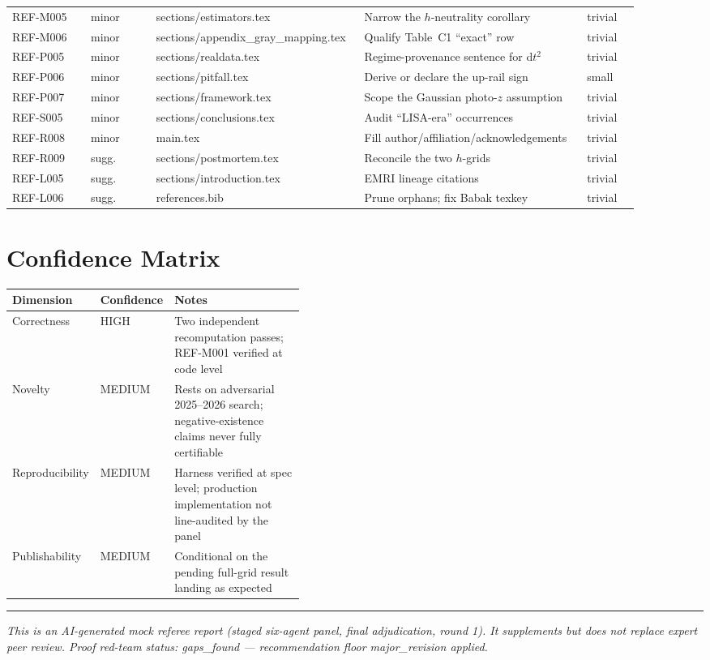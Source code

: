 \documentclass[11pt]{article}
\begin{document}
\begin{longtable}{@{}p{0.12\linewidth}p{0.10\linewidth}p{0.26\linewidth}>{\raggedright\arraybackslash}p{0.34\linewidth}p{0.08\linewidth}@{}}
REF-M005 & minor & sections/estimators.tex & Narrow the $h$-neutrality corollary & trivial \\
REF-M006 & minor & sections/appendix\_gray\_mapping.tex & Qualify Table~C1 ``exact'' row & trivial \\
REF-P005 & minor & sections/realdata.tex & Regime-provenance sentence for d$t^2$ & trivial \\
REF-P006 & minor & sections/pitfall.tex & Derive or declare the up-rail sign & small \\
REF-P007 & minor & sections/framework.tex & Scope the Gaussian photo-$z$ assumption & trivial \\
REF-S005 & minor & sections/conclusions.tex & Audit ``LISA-era'' occurrences & trivial \\
REF-R008 & minor & main.tex & Fill author/affiliation/acknowledgements & trivial \\
REF-R009 & sugg. & sections/postmortem.tex & Reconcile the two $h$-grids & trivial \\
REF-L005 & sugg. & sections/introduction.tex & EMRI lineage citations & trivial \\
REF-L006 & sugg. & references.bib & Prune orphans; fix Babak texkey & trivial \\
\bottomrule
\end{longtable}

\section*{Confidence Matrix}

\begin{tabularx}{\linewidth}{@{}p{0.26\linewidth}p{0.16\linewidth}Y@{}}
\toprule
\textbf{Dimension} & \textbf{Confidence} & \textbf{Notes} \\
\midrule
Correctness & HIGH & Two independent recomputation passes; REF-M001 verified at code level \\
Novelty & MEDIUM & Rests on adversarial 2025--2026 search; negative-existence claims never fully certifiable \\
Reproducibility & MEDIUM & Harness verified at spec level; production implementation not line-audited by the panel \\
Publishability & MEDIUM & Conditional on the pending full-grid result landing as expected \\
\bottomrule
\end{tabularx}

\vfill

{\color{ReportCrimson}\rule{\linewidth}{1.1pt}}

\small
\textit{This is an AI-generated mock referee report (staged six-agent panel, final adjudication, round 1). It supplements but does not replace expert peer review. Proof red-team status: gaps\_found --- recommendation floor major\_revision applied.}
\end{document}
